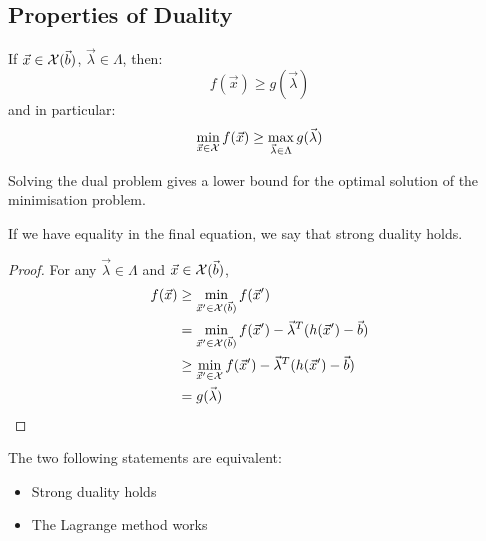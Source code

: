 \documentclass[../Main.tex]{subfiles}
\begin{document}
\subsection{Properties of Duality}
\begin{theorem}
    If $\vec{x} \in \mathcal{X}(\vec{b})$, $\vec{\lambda} \in \Lambda$, then:
    \begin{equation*}
        f(\vec{x}) \geq g(\vec{\lambda})
    \end{equation*}
    and in particular:
    \begin{equation*}
        \min_{\vec{x} \in \mathcal{X}} f(\vec{x}) \geq \max_{\vec{\lambda} \in \Lambda} g(\vec{\lambda})
    \end{equation*}
\end{theorem}
\begin{remarks}
    \item Solving the dual problem gives a lower bound for the optimal solution of the minimisation problem.
    \item If we have equality in the final equation, we say that strong duality holds.
\end{remarks}
\begin{proof}
    For any $\vec{\lambda} \in \Lambda$ and $\vec{x} \in \mathcal{X}(\vec{b})$,
    \begin{align*}
        f(\vec{x}) &\geq \min_{\vec{x}' \in \mathcal{X}(\vec{b})} f(\vec{x}') \\
        &= \min_{\vec{x}' \in \mathcal{X}(\vec{b})} f(\vec{x}') - \vec{\lambda}^T (h(\vec{x}') - \vec{b}) \\
        &\geq \min_{\vec{x}' \in \mathcal{X}} f(\vec{x}') - \vec{\lambda}^T (h(\vec{x}') - \vec{b}) \\
        &= g(\vec{\lambda})
    \end{align*}
\end{proof}
\begin{proposition}
    The two following statements are equivalent:
    \begin{itemize}
        \item Strong duality holds
        \item The Lagrange method works
    \end{itemize}
\end{proposition}
\end{document}

